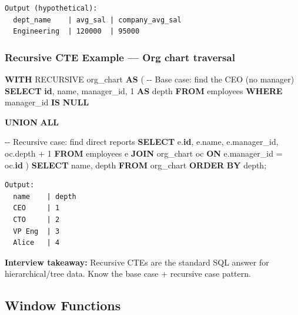 \documentclass[11pt]{article}
\newenvironment{Shaded}{\begin{snugshade}}{\end{snugshade}}
\newcommand{\CommentTok}[1]{\textcolor[rgb]{0.48,0.49,0.49}{#1}}
\newcommand{\DecValTok}[1]{\textcolor[rgb]{0.96,0.45,0.00}{#1}}
\newcommand{\FunctionTok}[1]{\textcolor[rgb]{0.56,0.27,0.68}{#1}}
\newcommand{\KeywordTok}[1]{\textcolor[rgb]{0.81,0.81,0.76}{\textbf{#1}}}
\newcommand{\NormalTok}[1]{\textcolor[rgb]{0.81,0.81,0.76}{#1}}
\newcommand{\OperatorTok}[1]{\textcolor[rgb]{0.81,0.81,0.76}{#1}}
\begin{document}
\setcodelang{}

\begin{verbatim}
Output (hypothetical):
  dept_name    | avg_sal | company_avg_sal
  Engineering  | 120000  | 95000
\end{verbatim}

\subsubsection{Recursive CTE Example --- Org chart traversal}\label{recursive-cte-example--org-chart-traversal}


\begin{Shaded}
\begin{Highlighting}[]
\KeywordTok{WITH}\NormalTok{ RECURSIVE org\_chart }\KeywordTok{AS}\NormalTok{ (}
    \CommentTok{{-}{-} Base case: find the CEO (no manager)}
    \KeywordTok{SELECT} \KeywordTok{id}\NormalTok{, name, manager\_id, }\DecValTok{1} \KeywordTok{AS} \FunctionTok{depth}
    \KeywordTok{FROM}\NormalTok{ employees}
    \KeywordTok{WHERE}\NormalTok{ manager\_id }\KeywordTok{IS} \KeywordTok{NULL}

    \KeywordTok{UNION} \KeywordTok{ALL}

    \CommentTok{{-}{-} Recursive case: find direct reports}
    \KeywordTok{SELECT}\NormalTok{ e.}\KeywordTok{id}\NormalTok{, e.name, e.manager\_id, oc.}\FunctionTok{depth} \OperatorTok{+} \DecValTok{1}
    \KeywordTok{FROM}\NormalTok{ employees e}
    \KeywordTok{JOIN}\NormalTok{ org\_chart oc }\KeywordTok{ON}\NormalTok{ e.manager\_id }\OperatorTok{=}\NormalTok{ oc.}\KeywordTok{id}
\NormalTok{)}
\KeywordTok{SELECT}\NormalTok{ name, }\FunctionTok{depth}
\KeywordTok{FROM}\NormalTok{ org\_chart}
\KeywordTok{ORDER} \KeywordTok{BY} \FunctionTok{depth}\NormalTok{;}
\end{Highlighting}
\end{Shaded}

\setcodelang{}

\begin{verbatim}
Output:
  name    | depth
  CEO     | 1
  CTO     | 2
  VP Eng  | 3
  Alice   | 4
\end{verbatim}

\textbf{Interview takeaway:} Recursive CTEs are the standard SQL answer for hierarchical/tree data. Know the base case + recursive case pattern.

\subsection{Window Functions}\label{window-functions}
\end{document}

